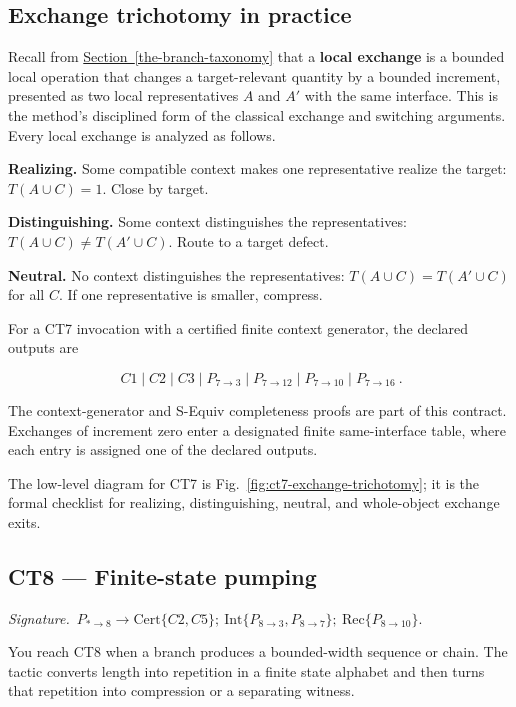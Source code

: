 \documentclass[
  11pt,
]{article}
\theoremstyle{definition}
\newcommand{\secref}[1]{\hyperref[#1]{Section~\ref*{#1}}}
\newcommand{\ctsignature}[1]{\par\noindent\emph{Signature.}\ #1\par\medskip}
\newcommand{\ctcert}[1]{\mathrm{Cert}\{#1\}}
\newcommand{\ctint}[1]{\mathrm{Int}\{#1\}}
\newcommand{\ctrec}[1]{\mathrm{Rec}\{#1\}}
\begin{document}
\subsection*{Exchange trichotomy in practice}

Recall from \secref{the-branch-taxonomy} that a \textbf{local exchange} is a bounded local
operation that changes a target-relevant quantity by a bounded
increment, presented as two local representatives \(A\) and \(A'\) with
the same interface. This is the method's disciplined form of the
classical exchange and switching arguments. Every local exchange is
analyzed as follows.

\textbf{Realizing.} Some compatible context makes one representative
realize the target: $T(A\cup C)=1$. Close by target.

\textbf{Distinguishing.} Some context distinguishes the representatives:
$T(A\cup C)\ne T(A'\cup C)$. Route to a target defect.

\textbf{Neutral.} No context distinguishes the representatives:
$T(A\cup C)=T(A'\cup C)$ for all $C$. If one representative is
smaller, compress.

For a CT7 invocation with a certified finite context generator, the
declared outputs are

\[
\boxed{\ C1\mid C2\mid C3\mid
P_{7\to3}\mid P_{7\to12}\mid P_{7\to10}\mid P_{7\to16}\ }.
\]

The context-generator and S-Equiv completeness proofs are part of this
contract. Exchanges of increment zero enter a designated finite
same-interface table, where each entry is assigned one of the declared
outputs.

The low-level diagram for CT7 is Fig.~\ref{fig:ct7-exchange-trichotomy};
it is the formal checklist for realizing, distinguishing, neutral, and
whole-object exchange exits.



\subsection{CT8 --- Finite-state pumping}\label{ct:8}\label{the-finite-state-pumping-principle}
\ctsignature{\(P_{\ast\to8}\to \ctcert{C2,C5};\ \ctint{P_{8\to3},P_{8\to7}};\ \ctrec{P_{8\to10}}\).}

You reach CT8 when a branch produces a bounded-width sequence or chain.
The tactic converts length into repetition in a finite state alphabet and
then turns that repetition into compression or a separating witness.
\end{document}
